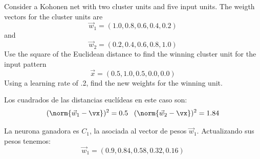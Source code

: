 \begin{problem}[4]
Consider a Kohonen net with two cluster units and five input units. The weigth vectors for the cluster units are
\[\vec{w}_1 = (1.0,0.8,0.6,0.4,0.2)\]
and
\[\vec{w}_2 = (0.2, 0.4, 0.6, 0.8, 1.0)\]
Use the square of the Euclidean distance to find the winning cluster unit for the input pattern
\[\vec{x} = (0.5, 1.0, 0.5, 0.0, 0.0)\]
Using a learning rate of .2, find the new weights for the winning unit.
\solution
{}

Los cuadrados de las distancias euclídeas en este caso son:
\[(\norm{\vec{w}_1-\vx})^2 = 0.5\;\;\; (\norm{\vec{w}_2-\vx})^2 = 1.84\]

La neurona ganadora es $C_1$, la asociada al vector de pesos $\vec{w}_1$. Actualizando sus pesos tenemos:
\[\vec{w}_1 = (0.9, 0.84,0.58,0.32, 0.16)\]
\end{problem}

